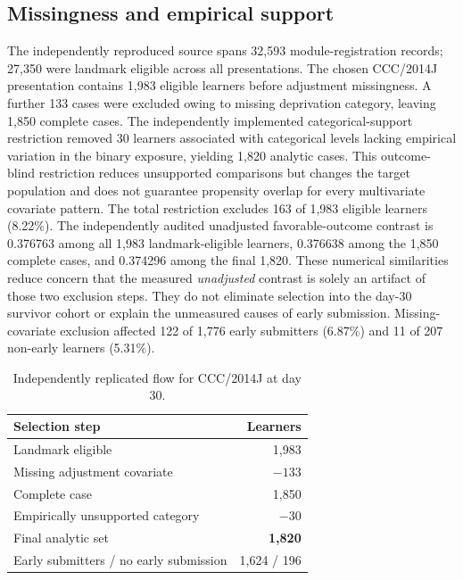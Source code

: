 \documentclass[10pt,a4paper]{article}
\begin{document}
\subsection{Missingness and empirical support}
The independently reproduced source spans 32,593 module-registration records; 27,350 were landmark eligible across all presentations. The chosen CCC/2014J presentation contains 1,983 eligible learners before adjustment missingness. A further 133 cases were excluded owing to missing deprivation category, leaving 1,850 complete cases. The independently implemented categorical-support restriction removed 30 learners associated with categorical levels lacking empirical variation in the binary exposure, yielding 1,820 analytic cases. This outcome-blind restriction reduces unsupported comparisons but changes the target population and does not guarantee propensity overlap for every multivariate covariate pattern. The total restriction excludes 163 of 1,983 eligible learners (8.22\%). The independently audited unadjusted favorable-outcome contrast is 0.376763 among all 1,983 landmark-eligible learners, 0.376638 among the 1,850 complete cases, and 0.374296 among the final 1,820. These numerical similarities reduce concern that the measured \emph{unadjusted} contrast is solely an artifact of those two exclusion steps. They do not eliminate selection into the day-30 survivor cohort or explain the unmeasured causes of early submission. Missing-covariate exclusion affected 122 of 1,776 early submitters (6.87\%) and 11 of 207 non-early learners (5.31\%).

\begin{table}[ht]\centering\small\caption{Independently replicated flow for CCC/2014J at day 30.}\begin{tabular}{lr}\toprule
Selection step & Learners\\\midrule
Landmark eligible & 1,983\\
Missing adjustment covariate & $-133$\\
Complete case & 1,850\\
Empirically unsupported category & $-30$\\
Final analytic set & \textbf{1,820}\\
Early submitters / no early submission & 1,624 / 196\\\bottomrule
\end{tabular}\end{table}
\end{document}
